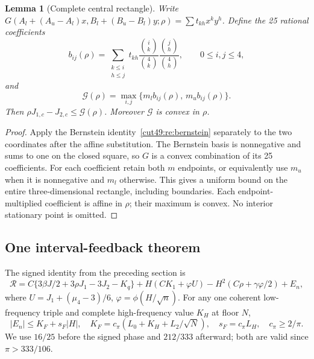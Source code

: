 \documentclass[11pt,a4paper]{article}
\numberwithin{equation}{section}
\newtheorem{lemma}[theorem]{Lemma}
\theoremstyle{definition}
\theoremstyle{remark}
\newcommand{\cR}{\mathcal R}
\begin{document}
\begin{lemma}[Complete central rectangle]\label{cut49:entry201:central}
Write $G(A_l+(A_u-A_l)x,B_l+(B_u-B_l)y;\rho)
=\sum t_{kh}x^ky^h$. Define the 25 rational coefficients
\[
 b_{ij}(\rho)=\sum_{\substack{k\le i\\h\le j}}
 t_{kh}\frac{\binom{i}{k}}{\binom4k}
          \frac{\binom{j}{h}}{\binom4h},\qquad 0\le i,j\le4,
\]
and
\[
 \mathcal G(\rho)=\max_{i,j}
       \{m_l b_{ij}(\rho),\,m_u b_{ij}(\rho)\}.
\]
Then $\rho J_{1,c}-J_{2,c}\le\mathcal G(\rho)$.
Moreover $\mathcal G$ is convex in $\rho$.
\end{lemma}
\begin{proof}
Apply the Bernstein identity~\eqref{cut49:re:bernstein} separately to the
two coordinates after the affine substitution. The Bernstein basis is nonnegative and sums to one on the closed square,
so $G$ is a convex combination of its 25 coefficients.
For each coefficient retain both $m$ endpoints, or equivalently use
$m_u$ when it is nonnegative and $m_l$ otherwise. This gives a uniform
bound on the entire three-dimensional rectangle, including boundaries.
Each endpoint-multiplied coefficient is affine in $\rho$; their maximum
is convex. No interior stationary point is omitted.
\end{proof}

\subsection{One interval-feedback theorem}
\label{cut49:entry:feedback}\label{cut49:fourier:uniform}

The signed identity from the preceding section is
\begin{equation}\label{cut49:entry:remainder}
 \cR=C\{3\beta J/2+3\rho J_1-3J_2-K_q\}
 +H(CK_1+\varphi U)-H^2(C\rho+\gamma\varphi/2)+E_n,
\end{equation}
where $U=J_1+(\mu_4-3)/6$, $\varphi=\phi(H/\sqrt n)$.
For any one coherent low-frequency triple and complete high-frequency value $K_H$ at floor $N$,
\begin{equation}\label{cut49:entry:fourier-budget}
 |E_n|\le K_F+s_F|H|,\quad
 K_F=c_\pi(L_0+K_H+L_2/\sqrt N),\quad s_F=c_\pi L_H,\quad c_\pi\ge2/\pi.
\end{equation}
We use $16/25$ before the signed phase and $212/333$
afterward; both are valid since $\pi>333/106$.
\end{document}
